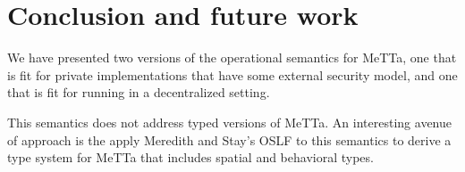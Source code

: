 \section{Conclusion and future work}

We have presented two versions of the operational semantics for MeTTa, one that is fit for private implementations that have some external security model, and one that is fit for running in a decentralized setting.

This semantics does not address typed versions of MeTTa. An interesting avenue of approach is the apply Meredith and Stay's OSLF to this semantics to derive a type system for MeTTa that includes spatial and behavioral types.
